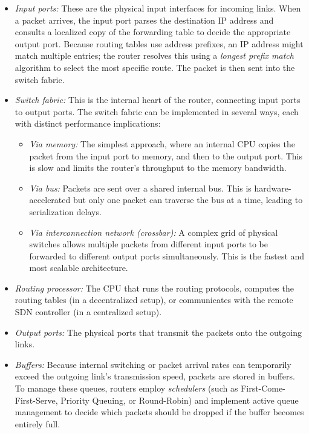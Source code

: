 \begin{itemize}
    \item \emph{Input ports:} These are the physical input interfaces for incoming links. When a packet arrives, the input port parses the destination IP address and consults a localized copy of the forwarding table to decide the appropriate output port. Because routing tables use address prefixes, an IP address might match multiple entries; the router resolves this using a \emph{longest prefix match} algorithm to select the most specific route. The packet is then sent into the switch fabric.
    \item \emph{Switch fabric:} This is the internal heart of the router, connecting input ports to output ports. The switch fabric can be implemented in several ways, each with distinct performance implications:
    \begin{itemize}
        \item \emph{Via memory:} The simplest approach, where an internal CPU copies the packet from the input port to memory, and then to the output port. This is slow and limits the router's throughput to the memory bandwidth.
        \item \emph{Via bus:} Packets are sent over a shared internal bus. This is hardware-accelerated but only one packet can traverse the bus at a time, leading to serialization delays.
        \item \emph{Via interconnection network (crossbar):} A complex grid of physical switches allows multiple packets from different input ports to be forwarded to different output ports simultaneously. This is the fastest and most scalable architecture.
    \end{itemize}
    \item \emph{Routing processor:} The CPU that runs the routing protocols, computes the routing tables (in a decentralized setup), or communicates with the remote SDN controller (in a centralized setup).
    \item \emph{Output ports:} The physical ports that transmit the packets onto the outgoing links.
    \item \emph{Buffers:} Because internal switching or packet arrival rates can temporarily exceed the outgoing link's transmission speed, packets are stored in buffers. To manage these queues, routers employ \emph{schedulers} (such as First-Come-First-Serve, Priority Queuing, or Round-Robin) and implement active queue management to decide which packets should be dropped if the buffer becomes entirely full.
\end{itemize}

